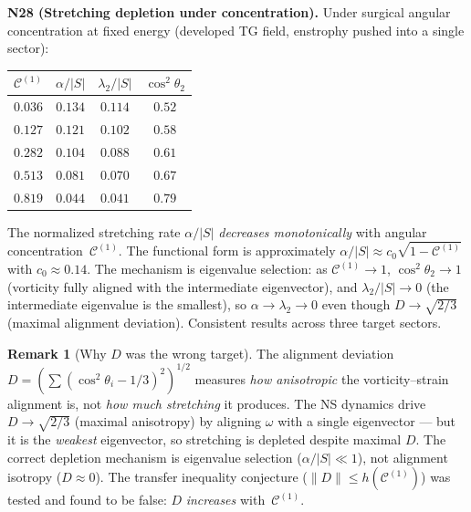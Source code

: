 \documentclass[11pt]{article}
\theoremstyle{definition}
\newtheorem{remark}[theorem]{Remark}
\newcommand{\cC}{\mathcal{C}}
\begin{document}
\textbf{N28 (Stretching depletion under
concentration).}
Under surgical angular concentration at fixed
energy (developed TG field, enstrophy pushed into
a single sector):
\begin{center}
\renewcommand{\arraystretch}{1.2}
\begin{tabular}{@{}cccc@{}}
\toprule
$\cC^{(1)}$ & $\alpha/|S|$
  & $\lambda_2/|S|$ & $\cos^2\theta_2$ \\
\midrule
$0.036$ & $0.134$ & $0.114$ & $0.52$ \\
$0.127$ & $0.121$ & $0.102$ & $0.58$ \\
$0.282$ & $0.104$ & $0.088$ & $0.61$ \\
$0.513$ & $0.081$ & $0.070$ & $0.67$ \\
$0.819$ & $0.044$ & $0.041$ & $0.79$ \\
\bottomrule
\end{tabular}
\end{center}
The normalized stretching rate $\alpha/|S|$
\emph{decreases monotonically} with angular
concentration~$\cC^{(1)}$.  The functional form
is approximately $\alpha/|S|\approx
c_0\sqrt{1-\cC^{(1)}}$ with $c_0\approx 0.14$.
The mechanism is eigenvalue selection: as
$\cC^{(1)}\to 1$, $\cos^2\theta_2\to 1$
(vorticity fully aligned with the intermediate
eigenvector), and $\lambda_2/|S|\to 0$ (the
intermediate eigenvalue is the smallest), so
$\alpha\to\lambda_2\to 0$ even though $D\to
\sqrt{2/3}$ (maximal alignment deviation).
Consistent results across three target sectors.

\begin{remark}[Why $D$ was the wrong target]
\label{rem:wrong-target}
The alignment deviation
$D=(\sum(\cos^2\theta_i-1/3)^2)^{1/2}$ measures
\emph{how anisotropic} the vorticity--strain
alignment is, not \emph{how much stretching}
it produces.  The NS dynamics drive
$D\to\sqrt{2/3}$ (maximal anisotropy) by aligning
$\omega$ with a single eigenvector --- but it is
the \emph{weakest} eigenvector, so stretching
is depleted despite maximal $D$.  The
correct depletion mechanism is eigenvalue
selection ($\alpha/|S|\ll 1$), not alignment
isotropy ($D\approx 0$).  The transfer inequality
conjecture ($\|D\|\leq h(\cC^{(1)})$) was tested
and found to be false: $D$ \emph{increases}
with~$\cC^{(1)}$.
\end{remark}
\end{document}
